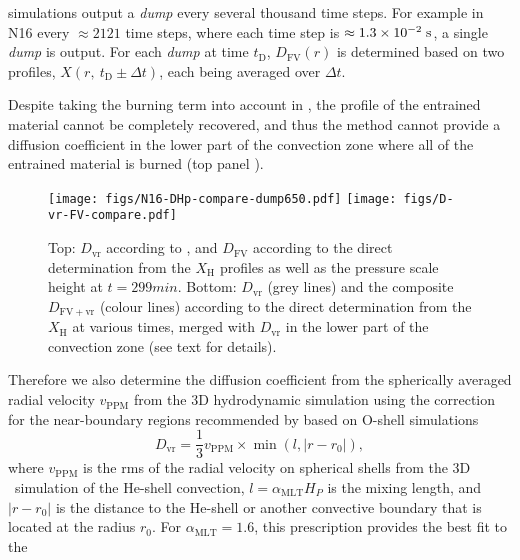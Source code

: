 \documentclass[fleqn,usenatbib]{mnras}
\newcommand{\ppmstar}{\code{PPMstar}}
\begin{document}
\ppmstar{} simulations output a \textit{dump} every several thousand time steps.
For example in N16 every $\approx 2121$ time steps, where each time step is
$\approx 1.3\times 10^{-2}\;\mathrm{\mathrm{s}}$, a single \textit{dump} is output.
For each \textit{dump} at time $t_\mathrm{D}$, $D_\mathrm{FV}(r)$ is determined
based on two profiles, $X(r,\ t_\mathrm{D}\pm \Delta t)$, each being averaged
over $\Delta t$.

Despite taking the burning term into account in , the profile
of the entrained material cannot be completely recovered, and thus the method
cannot provide a diffusion coefficient in the lower part of the convection zone
where all of the entrained material is burned (top panel ).
%
\begin{figure}
  \centering
	\texttt{[image: figs/N16-DHp-compare-dump650.pdf]}
	\texttt{[image: figs/D-vr-FV-compare.pdf]}
  \caption{Top: $D_\mathrm{vr}$ according to , and
          $D_\mathrm{FV}$ according to the direct determination from the
          $X_\mathrm{H}$ profiles as well as the pressure scale
          height at $t = \unit{299}{min}$. Bottom: $D_\mathrm{vr}$ (grey lines) and the composite
          $D_\mathrm{FV+vr}$ (colour lines) according to the direct
          determination from the $X_\mathrm{H}$ at various times, merged
          with $D_\mathrm{vr}$ in the lower part of the convection zone (see
          text for details). }
  \label{fig:DvrDVF-compare}
\end{figure}
%
Therefore we also determine the diffusion coefficient from the
spherically averaged radial velocity $v_\mathrm{PPM}$ from the 3D
hydrodynamic simulation using the correction for the near-boundary
regions recommended by \citet{Jones:2017kc} based on O-shell
simulations
%
\begin{equation}
D_\mathrm{vr} = \frac{1}{3} v_\mathrm{PPM}\times \min \left(l,|r-r_0|\right),
\label{eq:dvr}
\end{equation}
%
where $v_\mathrm{PPM}$ is the rms of the radial velocity on spherical shells
from the 3D \ppmstar\ simulation of the He-shell convection, $l =
\alpha_{\mathrm{MLT}} H_P$ is the mixing length, and $|r-r_0|$ is the distance
to the He-shell or another convective boundary that is located at the radius $r_0$. For
$\alpha_{\mathrm{MLT}} = 1.6$, this prescription provides the best fit to the
\end{document}
